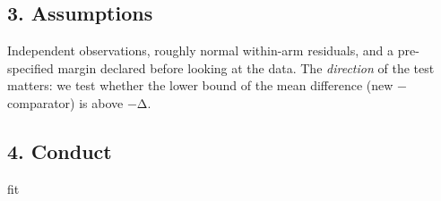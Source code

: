\documentclass[
]{article}
\newenvironment{Shaded}{\begin{snugshade}}{\end{snugshade}}
\newcommand{\AttributeTok}[1]{\textcolor[rgb]{0.13,0.29,0.53}{#1}}
\newcommand{\CommentTok}[1]{\textcolor[rgb]{0.56,0.35,0.01}{\textit{#1}}}
\newcommand{\DecValTok}[1]{\textcolor[rgb]{0.00,0.00,0.81}{#1}}
\newcommand{\FunctionTok}[1]{\textcolor[rgb]{0.13,0.29,0.53}{\textbf{#1}}}
\newcommand{\NormalTok}[1]{#1}
\newcommand{\OtherTok}[1]{\textcolor[rgb]{0.56,0.35,0.01}{#1}}
\newcommand{\SpecialCharTok}[1]{\textcolor[rgb]{0.81,0.36,0.00}{\textbf{#1}}}
\begin{document}
\subsection{3. Assumptions}\label{assumptions}

Independent observations, roughly normal within-arm residuals, and a
pre-specified margin declared before looking at the data. The
\emph{direction} of the test matters: we test whether the lower bound of
the mean difference (new − comparator) is above −Δ.

\subsection{4. Conduct}\label{conduct}

\begin{Shaded}
\begin{Highlighting}[]
\NormalTok{fit}
\end{Highlighting}
\end{Shaded}

\begin{Shaded}
\end{Shaded}
\end{document}
